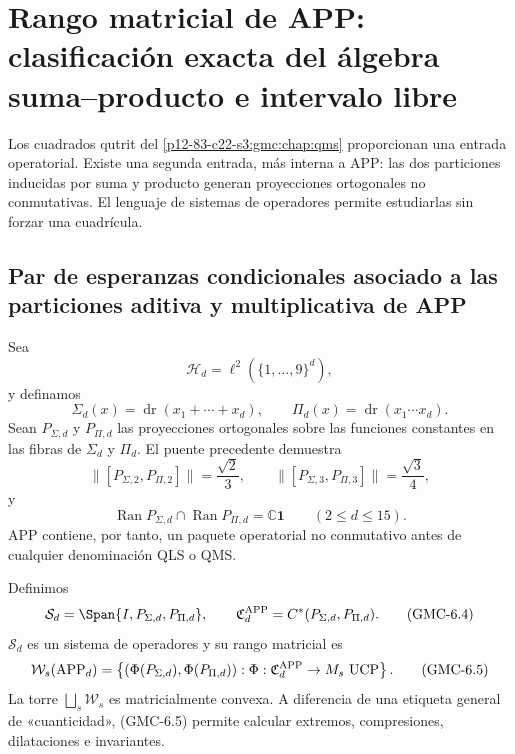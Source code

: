\ifdefined\HMTGMCOperatorialAPP
\section[Rango matricial de APP]{Rango matricial de APP: clasificación exacta
del álgebra suma--producto e intervalo libre}
\label{p12-83-c22-s1:gmc:chap:operatorios}

Los cuadrados qutrit del \cref{p12-83-c22-s3:gmc:chap:qms} proporcionan una entrada
operatorial. Existe una
segunda entrada, más interna a APP: las dos particiones inducidas por suma y
producto generan proyecciones ortogonales no conmutativas. El lenguaje de
sistemas de operadores permite estudiarlas sin forzar una cuadrícula.

\subsection{Par de esperanzas condicionales asociado a las particiones aditiva y multiplicativa de APP}

Sea
\[
 \mathcal H_d=\ell^2(\{1,\ldots,9\}^d),
\]
y definamos
\[
 \Sigma_d(x)=\operatorname{dr}(x_1+\cdots+x_d),
 \qquad
 \Pi_d(x)=\operatorname{dr}(x_1\cdots x_d).
 \tag{GMC-6.1}
\]
Sean $P_{\Sigma,d}$ y $P_{\Pi,d}$ las proyecciones ortogonales sobre las
funciones constantes en las fibras de $\Sigma_d$ y $\Pi_d$. El puente
precedente demuestra
\[
 \|[P_{\Sigma,2},P_{\Pi,2}]\|=\frac{\sqrt2}{3},
 \qquad
 \|[P_{\Sigma,3},P_{\Pi,3}]\|=\frac{\sqrt3}{4},
 \tag{GMC-6.2}
\]
y
\[
 \operatorname{Ran}P_{\Sigma,d}\cap
 \operatorname{Ran}P_{\Pi,d}=\mathbb C\mathbf1
 \qquad(2\le d\le15).
 \tag{GMC-6.3}
\]
APP contiene, por tanto, un paquete operatorial no conmutativo antes de
cualquier denominación QLS o QMS.

Definimos
\[
 \mathcal S_d=\Span\{I,P_{\Sigma,d},P_{\Pi,d}\},
 \qquad
 \mathfrak C_d^{\rm APP}=C^*(P_{\Sigma,d},P_{\Pi,d}).
 \tag{GMC-6.4}
\]
$\mathcal S_d$ es un sistema de operadores y su rango matricial es
\[
 \mathcal W_s(\mathrm{APP}_d)=
 \left\{(\Phi(P_{\Sigma,d}),\Phi(P_{\Pi,d})):
 \Phi:\mathfrak C_d^{\rm APP}\to M_s\ \text{UCP}\right\}.
 \tag{GMC-6.5}
\]
La torre $\bigsqcup_s\mathcal W_s$ es matricialmente convexa. A diferencia de
una etiqueta general de «cuanticidad», \textup{(GMC-6.5)} permite calcular extremos,
compresiones, dilataciones e invariantes.


